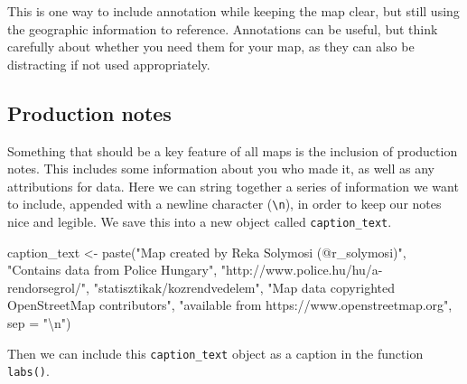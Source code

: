 \documentclass[
]{book}
\makeatletter
\newenvironment{Shaded}{\begin{snugshade}}{\end{snugshade}}
\newcommand{\AttributeTok}[1]{\textcolor[rgb]{0.61,0.61,0.61}{#1}}
\newcommand{\FunctionTok}[1]{\textcolor[rgb]{0,0,0}{#1}}
\newcommand{\NormalTok}[1]{#1}
\newcommand{\OtherTok}[1]{\textcolor[rgb]{0.37,0.37,0.37}{#1}}
\newcommand{\SpecialCharTok}[1]{\textcolor[rgb]{0,0,0}{#1}}
\newcommand{\StringTok}[1]{\textcolor[rgb]{0.5,0.5,0.5}{#1}}
\newenvironment{kframe}{%
\medskip{}
\setlength{\fboxsep}{.8em}
 \def\at@end@of@kframe{}%
 \ifinner\ifhmode%
  \def\at@end@of@kframe{\end{minipage}}%
  \begin{minipage}{\columnwidth}%
 \fi\fi%
 \def\FrameCommand##1{\hskip\@totalleftmargin \hskip-\fboxsep
 \colorbox{shadecolor}{##1}\hskip-\fboxsep
     \hskip-\linewidth \hskip-\@totalleftmargin \hskip\columnwidth}%
 \MakeFramed {\advance\hsize-\width
   \@totalleftmargin\z@ \linewidth\hsize
   \@setminipage}}%
 {\par\unskip\endMakeFramed%
 \at@end@of@kframe}
\renewenvironment{Shaded}{\begin{kframe}}{\end{kframe}}
\makeatother
\begin{document}
This is one way to include annotation while keeping the map clear, but still using the geographic information to reference. Annotations can be useful, but think carefully about whether you need them for your map, as they can also be distracting if not used appropriately.

\hypertarget{production-notes}{%
\subsection{Production notes}\label{production-notes}}

Something that should be a key feature of all maps is the inclusion of production notes. This includes some information about you who made it, as well as any attributions for data. Here we can string together a series of information we want to include, appended with a newline character (\texttt{\textbackslash{}n}), in order to keep our notes nice and legible. We save this into a new object called \texttt{caption\_text}.

\begin{Shaded}
\begin{Highlighting}[]
\NormalTok{caption\_text }\OtherTok{\textless{}{-}} \FunctionTok{paste}\NormalTok{(}\StringTok{"Map created by Reka Solymosi (@r\_solymosi)"}\NormalTok{, }
                       \StringTok{"Contains data from Police Hungary"}\NormalTok{,}
                       \StringTok{"http://www.police.hu/hu/a{-}rendorsegrol/"}\NormalTok{,}
                       \StringTok{"statisztikak/kozrendvedelem"}\NormalTok{, }
                       \StringTok{"Map data copyrighted OpenStreetMap contributors"}\NormalTok{, }
                       \StringTok{"available from https://www.openstreetmap.org"}\NormalTok{, }
                       \AttributeTok{sep =} \StringTok{"}\SpecialCharTok{\textbackslash{}n}\StringTok{"}\NormalTok{)}
\end{Highlighting}
\end{Shaded}

Then we can include this \texttt{caption\_text} object as a caption in the function \texttt{labs()}.
\end{document}
